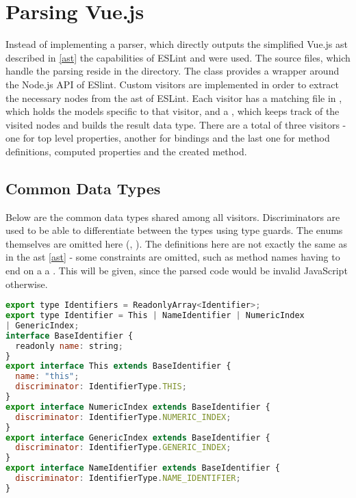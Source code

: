 \section{Parsing Vue.js}

Instead of implementing a parser, which directly outputs the simplified Vue.js \gls{ast} described in \ref{ast} the capabilities of ESLint \parencite{eslintMainPage} 
and \parencite{eslint_vue_parser} were used. 
The source files, which handle the parsing reside in the  directory.
The  class provides a wrapper around the Node.js API of ESlint. Custom visitors are implemented in order to extract the necessary nodes from the \gls{ast} of ESLint. Each visitor has a matching file in , which holds the models specific to that visitor, and a , which keeps track of the visited nodes and builds the result data type. There are a total of three visitors - one for top level properties, another for bindings and the last one for method definitions, computed properties and the created method.
 
\subsection{Common Data Types}
\label{common_data_types}
Below are the common data types shared among all visitors. Discriminators are used to be able to differentiate between the types using type guards. The enums themselves are omitted here (, ). The definitions here are not exactly the same as in the \gls{ast} \ref{ast} - some constraints are omitted, such as method names having to end on a a . This will be given, since the parsed code would be invalid JavaScript otherwise.
\begin{lstlisting}[language=JavaScript,caption={Common data type identifier}, captionpos=b]
export type Identifiers = ReadonlyArray<Identifier>;
export type Identifier = This | NameIdentifier | NumericIndex 
| GenericIndex;
interface BaseIdentifier {
  readonly name: string;
}
export interface This extends BaseIdentifier {
  name: "this";
  discriminator: IdentifierType.THIS;
}
export interface NumericIndex extends BaseIdentifier {
  discriminator: IdentifierType.NUMERIC_INDEX;
}
export interface GenericIndex extends BaseIdentifier {
  discriminator: IdentifierType.GENERIC_INDEX;
}
export interface NameIdentifier extends BaseIdentifier {
  discriminator: IdentifierType.NAME_IDENTIFIER;
}
\end{lstlisting}

